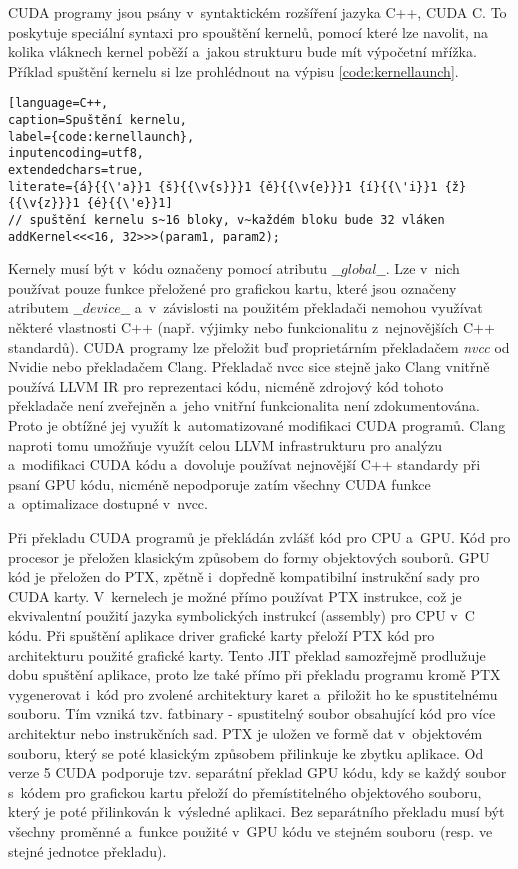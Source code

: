 CUDA programy jsou psány v~syntaktickém rozšíření jazyka C++, CUDA C. To poskytuje speciální syntaxi pro spouštění kernelů, pomocí které lze navolit, na kolika vláknech kernel poběží a~jakou strukturu bude mít výpočetní mřížka. Příklad spuštění kernelu si lze prohlédnout na výpisu \ref{code:kernellaunch}.

\begin{lstlisting}[language=C++,
caption=Spuštění kernelu,
label={code:kernellaunch},
inputencoding=utf8,
extendedchars=true,
literate={á}{{\'a}}1 {š}{{\v{s}}}1 {ě}{{\v{e}}}1 {í}{{\'i}}1 {ž}{{\v{z}}}1 {é}{{\'e}}1]
// spuštění kernelu s~16 bloky, v~každém bloku bude 32 vláken
addKernel<<<16, 32>>>(param1, param2);
\end{lstlisting}

Kernely musí být v~kódu označeny pomocí atributu $\_\_global\_\_$. Lze v~nich používat pouze funkce přeložené pro grafickou kartu, které jsou označeny atributem $\_\_device\_\_$ a~v~závislosti na použitém překladači nemohou využívat některé vlastnosti C++ (např. výjimky nebo funkcionalitu z~nejnovějších C++ standardů). CUDA programy lze přeložit buď proprietárním překladačem \emph{nvcc} od Nvidie nebo překladačem Clang. Překladač nvcc sice stejně jako Clang vnitřně používá LLVM IR pro reprezentaci kódu, nicméně zdrojový kód tohoto překladače není zveřejněn a~jeho vnitřní funkcionalita není zdokumentována. Proto je obtížné jej využít k~automatizované modifikaci CUDA programů. Clang naproti tomu umožňuje využít celou LLVM infrastrukturu pro analýzu a~modifikaci CUDA kódu a~dovoluje používat nejnovější C++ standardy při psaní GPU kódu, nicméně nepodporuje zatím všechny CUDA funkce a~optimalizace dostupné v~nvcc.

Při překladu CUDA programů je překládán zvlášť kód pro CPU a~GPU. Kód pro procesor je přeložen klasickým způsobem do formy objektových souborů. GPU kód je přeložen do PTX, zpětně i~dopředně kompatibilní instrukční sady pro CUDA karty. V~kernelech je možné přímo používat PTX instrukce, což je ekvivalentní použití jazyka symbolických instrukcí (assembly) pro CPU v~C kódu. Při spuštění aplikace driver grafické karty přeloží PTX kód pro architekturu použité grafické karty. Tento JIT překlad samozřejmě prodlužuje dobu spuštění aplikace, proto lze také přímo při překladu programu kromě PTX vygenerovat i~kód pro zvolené architektury karet a~přiložit ho ke spustitelnému souboru. Tím vzniká tzv. fatbinary - spustitelný soubor obsahující kód pro více architektur nebo instrukčních sad. PTX je uložen ve formě dat v~objektovém souboru, který se poté klasickým způsobem přilinkuje ke zbytku aplikace. Od verze 5 CUDA podporuje tzv. separátní překlad GPU kódu, kdy se každý soubor s~kódem pro grafickou kartu přeloží do přemístitelného objektového souboru, který je poté přilinkován k~výsledné aplikaci. Bez separátního překladu musí být všechny proměnné a~funkce použité v~GPU kódu ve stejném souboru (resp. ve stejné jednotce překladu).

